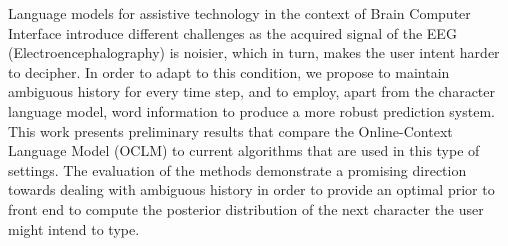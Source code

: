 Language models for assistive technology in the context of Brain Computer Interface introduce different challenges as the acquired signal of the EEG (Electroencephalography) is noisier, which in turn, makes the user intent harder to decipher. In order to adapt to this condition, we propose to maintain ambiguous history for every time step, and to employ, apart from the character language model, word information to produce a more robust prediction system. This work presents preliminary results that compare the Online-Context Language Model (OCLM) to current algorithms that are used in this type of settings. The evaluation of the methods demonstrate a promising direction towards dealing with ambiguous history in order to provide an optimal prior to front end to compute the posterior distribution of the next character the user might intend to type.
